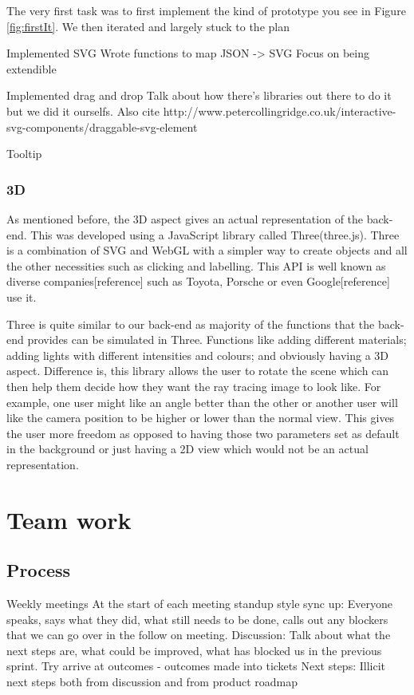 \documentclass[a4paper]{report}
\begin{document}
	The very first task was to first implement the kind of prototype you see in Figure \ref{fig:firstIt}.
	We then iterated and largely stuck to the plan
	
	Implemented SVG
	Wrote functions to map JSON -> SVG
	Focus on being extendible
	
	Implemented drag and drop
	Talk about how there's libraries out there to do it but we did it ourselfs. Also cite http://www.petercollingridge.co.uk/interactive-svg-components/draggable-svg-element
	
	Tooltip
	
	
	\subsection{3D}
	As mentioned before, the 3D aspect gives an actual representation of the back-end. This was developed using a JavaScript library called Three(three.js). Three is a combination of SVG and WebGL with a simpler way to create objects and all the other necessities such as clicking and labelling. This API is well known as diverse companies[reference] such as Toyota, Porsche or even Google[reference] use it. 
	
	Three is quite similar to our back-end as majority of the functions that the back-end provides can be simulated in Three. Functions like adding different materials; adding lights with different intensities and colours; and obviously having a 3D aspect. Difference is, this library allows the user to rotate the scene which can then help them decide how they want the ray tracing image to look like. For example, one user might like an angle better than the other or another user will like the camera position to be higher or lower than the normal view. This gives the user more freedom as opposed to having those two parameters set as default in the background or just having a 2D view which would not be an actual representation. 
	
	
	\chapter{Team work} 
	
	
	\section{Process}
	Weekly meetings
	At the start of each meeting standup style sync up:
	Everyone speaks, says what they did, what still needs to be done, calls out any blockers that we can go over in the follow on meeting.
	Discussion: 
	Talk about what the next steps are, what could be improved, what has blocked us in the previous sprint. Try arrive at outcomes - outcomes made into tickets
	Next steps:
	Illicit next steps both from discussion and from product roadmap
	
\end{document}
